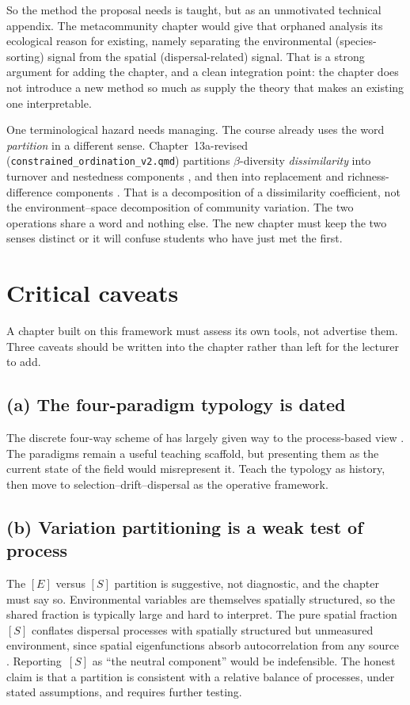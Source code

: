 \documentclass[11pt,a4paper]{article}
\newcommand{\fname}[1]{\texttt{\small #1}}
\begin{document}
So the method the proposal needs is taught, but as an unmotivated technical appendix. The
metacommunity chapter would give that orphaned analysis its ecological reason for
existing, namely separating the environmental (species-sorting) signal from the spatial
(dispersal-related) signal. That is a strong argument for adding the chapter, and a clean
integration point: the chapter does not introduce a new method so much as supply the
theory that makes an existing one interpretable.

One terminological hazard needs managing. The course already uses the word
\emph{partition} in a different sense. Chapter~13a-revised (\fname{constrained\_ordination\_v2.qmd})
partitions $\beta$-diversity \emph{dissimilarity} into turnover and nestedness components
\citep{baselga2010}, and then into replacement and richness-difference components
\citep{legendre2014}. That is a decomposition of a dissimilarity coefficient, not the
environment--space decomposition of community variation. The two operations share a word
and nothing else. The new chapter must keep the two senses distinct or it will confuse
students who have just met the first.

\section{Critical caveats}

A chapter built on this framework must assess its own tools, not advertise them. Three
caveats should be written into the chapter rather than left for the lecturer to add.

\subsection*{(a) The four-paradigm typology is dated}
The discrete four-way scheme of \citet{leibold2004} has largely given way to the
process-based view \citep{vellend2010,logue2011,leibold2018}. The paradigms remain a
useful teaching scaffold, but presenting them as the current state of the field would
misrepresent it. Teach the typology as history, then move to selection--drift--dispersal
as the operative framework.

\subsection*{(b) Variation partitioning is a weak test of process}
The $[E]$ versus $[S]$ partition is suggestive, not diagnostic, and the chapter must say
so. Environmental variables are themselves spatially structured, so the shared fraction is
typically large and hard to interpret. The pure spatial fraction~$[S]$ conflates dispersal
processes with spatially structured but unmeasured environment, since spatial
eigenfunctions absorb autocorrelation from any source \citep{gilbert2010, smith2010,
tuomisto2006, peresneto2010}. Reporting~$[S]$ as ``the neutral component'' would be
indefensible. The honest claim is that a partition is consistent with a relative balance
of processes, under stated assumptions, and requires further testing.
\end{document}
